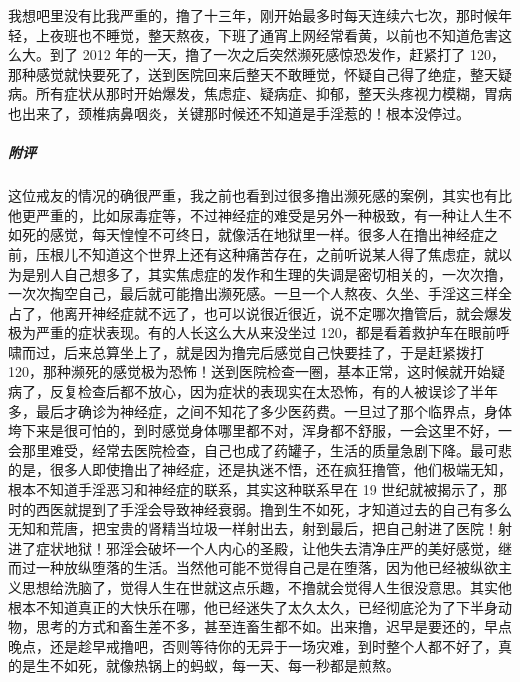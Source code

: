 \begin{case}
    我想吧里没有比我严重的，撸了十三年，刚开始最多时每天连续六七次，那时候年轻，上夜班也不睡觉，整天熬夜，下班了通宵上网经常看黄，以前也不知道危害这么大。到了 2012 年的一天，撸了一次之后突然濒死感惊恐发作，赶紧打了 120，那种感觉就快要死了，送到医院回来后整天不敢睡觉，怀疑自己得了绝症，整天疑病。所有症状从那时开始爆发，焦虑症、疑病症、抑郁，整天头疼视力模糊，胃病也出来了，颈椎病鼻咽炎，关键那时候还不知道是手淫惹的！根本没停过。
    \subparagraph{附评} 这位戒友的情况的确很严重，我之前也看到过很多撸出濒死感的案例，其实也有比他更严重的，比如尿毒症等，不过神经症的难受是另外一种极致，有一种让人生不如死的感觉，每天惶惶不可终日，就像活在地狱里一样。很多人在撸出神经症之前，压根儿不知道这个世界上还有这种痛苦存在，之前听说某人得了焦虑症，就以为是别人自己想多了，其实焦虑症的发作和生理的失调是密切相关的，一次次撸，一次次掏空自己，最后就可能撸出濒死感。一旦一个人熬夜、久坐、手淫这三样全占了，他离开神经症就不远了，也可以说很近很近，说不定哪次撸管后，就会爆发极为严重的症状表现。有的人长这么大从来没坐过 120，都是看着救护车在眼前呼啸而过，后来总算坐上了，就是因为撸完后感觉自己快要挂了，于是赶紧拨打 120，那种濒死的感觉极为恐怖！送到医院检查一圈，基本正常，这时候就开始疑病了，反复检查后都不放心，因为症状的表现实在太恐怖，有的人被误诊了半年多，最后才确诊为神经症，之间不知花了多少医药费。一旦过了那个临界点，身体垮下来是很可怕的，到时感觉身体哪里都不对，浑身都不舒服，一会这里不好，一会那里难受，经常去医院检查，自己也成了药罐子，生活的质量急剧下降。最可悲的是，很多人即使撸出了神经症，还是执迷不悟，还在疯狂撸管，他们极端无知，根本不知道手淫恶习和神经症的联系，其实这种联系早在 19 世纪就被揭示了，那时的西医就提到了手淫会导致神经衰弱。撸到生不如死，才知道过去的自己有多么无知和荒唐，把宝贵的肾精当垃圾一样射出去，射到最后，把自己射进了医院！射进了症状地狱！邪淫会破坏一个人内心的圣殿，让他失去清净庄严的美好感觉，继而过一种放纵堕落的生活。当然他可能不觉得自己是在堕落，因为他已经被纵欲主义思想给洗脑了，觉得人生在世就这点乐趣，不撸就会觉得人生很没意思。其实他根本不知道真正的大快乐在哪，他已经迷失了太久太久，已经彻底沦为了下半身动物，思考的方式和畜生差不多，甚至连畜生都不如。出来撸，迟早是要还的，早点晚点，还是趁早戒撸吧，否则等待你的无异于一场灾难，到时整个人都不好了，真的是生不如死，就像热锅上的蚂蚁，每一天、每一秒都是煎熬。
\end{case}

